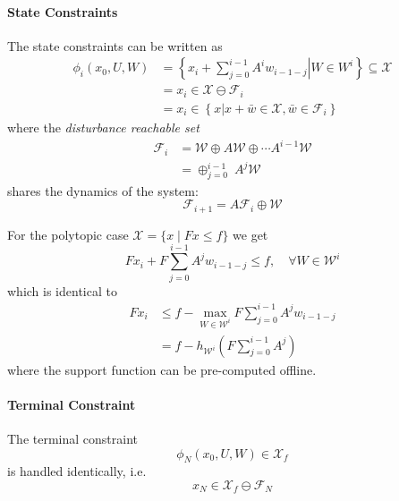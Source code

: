 \paragraph{State Constraints}
The state constraints can be written as
\begin{align*}
    \phi_i(x_0,U,W) & =\left\{\left.x_i+\sum_{j=0}^{i-1}A^i w_{i-1-j}\right|W\in W^i\right\}\subseteq\mathcal{X} \\
                    & = x_i \in \mathcal{X} \ominus \mathcal{F}_i                                                \\
                    & = x_i \in \left\{x | x+\bar{w}\in \mathcal{X}, \bar{w}\in \mathcal{F}_i\right\}
\end{align*}
where the \textit{disturbance reachable set}
\begin{align*}
    \mathcal{F}_i & = \mathcal{W} \oplus A \mathcal{W} \oplus \cdots A^{i-1} \mathcal{W} \\
                  & = \oplus_{j=0}^{i-1}\; A^{j} \mathcal{W}
\end{align*}
shares the dynamics of the system:
\begin{equation*}
    \mathcal{F}_{i+1} = A\mathcal{F}_i \oplus \mathcal{W}
\end{equation*}
\newpar{}

For the polytopic case $\mathcal{X} = \{x \mid Fx \leq f\}$ we get
\begin{equation*}
    Fx_i + F \sum_{j=0}^{i-1} A^j w_{i-1-j} \leq f, \quad \forall W \in \mathcal{W}^i
\end{equation*}
which is identical to
\begin{align*}
    Fx_i & \leq f - \max_{W \in \mathcal{W}^i} F \sum_{j=0}^{i-1} A^j w_{i-1-j} \\
         & = f - h_{\mathcal{W}^i} \left(F \sum_{j=0}^{i-1} A^j\right)
\end{align*}
where the support function can be pre-computed offline.
\paragraph{Terminal Constraint}
The terminal constraint
\begin{equation*}
    \phi_N(x_0, U, W)\in \mathcal{X}_f
\end{equation*}
is handled identically, i.e.\
\begin{equation*}
    x_N \in \mathcal{X}_f \ominus \mathcal{F}_N
\end{equation*}

